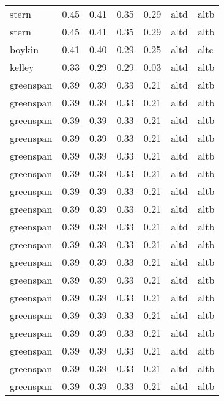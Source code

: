 \begin{tabular}{lrrrrll}
     stern &     0.45 &     0.41 &     0.35 &     0.29 &      altd &     altb \\
     stern &     0.45 &     0.41 &     0.35 &     0.29 &      altd &     altb \\
    boykin &     0.41 &     0.40 &     0.29 &     0.25 &      altd &     altc \\
    kelley &     0.33 &     0.29 &     0.29 &     0.03 &      altd &     altb \\
 greenspan &     0.39 &     0.39 &     0.33 &     0.21 &      altd &     altb \\
 greenspan &     0.39 &     0.39 &     0.33 &     0.21 &      altd &     altb \\
 greenspan &     0.39 &     0.39 &     0.33 &     0.21 &      altd &     altb \\
 greenspan &     0.39 &     0.39 &     0.33 &     0.21 &      altd &     altb \\
 greenspan &     0.39 &     0.39 &     0.33 &     0.21 &      altd &     altb \\
 greenspan &     0.39 &     0.39 &     0.33 &     0.21 &      altd &     altb \\
 greenspan &     0.39 &     0.39 &     0.33 &     0.21 &      altd &     altb \\
 greenspan &     0.39 &     0.39 &     0.33 &     0.21 &      altd &     altb \\
 greenspan &     0.39 &     0.39 &     0.33 &     0.21 &      altd &     altb \\
 greenspan &     0.39 &     0.39 &     0.33 &     0.21 &      altd &     altb \\
 greenspan &     0.39 &     0.39 &     0.33 &     0.21 &      altd &     altb \\
 greenspan &     0.39 &     0.39 &     0.33 &     0.21 &      altd &     altb \\
 greenspan &     0.39 &     0.39 &     0.33 &     0.21 &      altd &     altb \\
 greenspan &     0.39 &     0.39 &     0.33 &     0.21 &      altd &     altb \\
 greenspan &     0.39 &     0.39 &     0.33 &     0.21 &      altd &     altb \\
 greenspan &     0.39 &     0.39 &     0.33 &     0.21 &      altd &     altb \\
 greenspan &     0.39 &     0.39 &     0.33 &     0.21 &      altd &     altb \\
 greenspan &     0.39 &     0.39 &     0.33 &     0.21 &      altd &     altb \\

\end{tabular}
